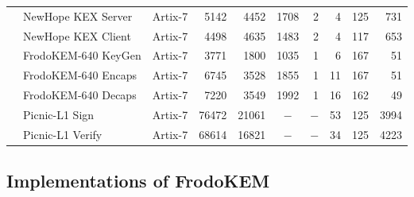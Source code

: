 \begin{table*}[tbhp]
\begin{center}
{\begin{tabular}{c l l N{5}{0} N{5}{0} N{5}{0} N{3}{0} N{3}{0} N{3}{0} N{5}{0}}
& \textsf{NewHope} KEX Server \cite{oder2017implementing}   & Artix-7   & 5142 & 4452 & 1708 & 2 & 4 & 125 & 731 \\
& \textsf{NewHope} KEX Client \cite{oder2017implementing}  & Artix-7   & 4498 & 4635 & 1483 & 2 & 4 & 117 & 653 \\  \Tstrut
& \textsf{FrodoKEM}-640 KeyGen \cite{howe2018standard} & Artix-7 & 3771 & 1800 & 1035 & 1 & 6 & 167 & 51 \\
& \textsf{FrodoKEM}-640 Encaps \cite{howe2018standard}  & Artix-7 & 6745 & 3528 & 1855 & 1 & 11 & 167 & 51 \\
& \textsf{FrodoKEM}-640 Decaps \cite{howe2018standard}  & Artix-7 & 7220 & 3549 & 1992 & 1 & 16 & 162 & 49 \\ \hline \Tstrut
 \parbox[t]{5mm}{} & \textsf{Picnic}-L1 Sign \cite{kales2020efficient} & Artix-7 & 76472 & 21061 &  &  & 53 & 125 & 3994 \\
& \textsf{Picnic}-L1 Verify \cite{kales2020efficient} & Artix-7 & 68614 & 16821 &  &  & 34 & 125 & 4223 \\ 	
\hline
\end{tabular}}%
\end{center}
\end{table*}

\subsection{Implementations of FrodoKEM}

